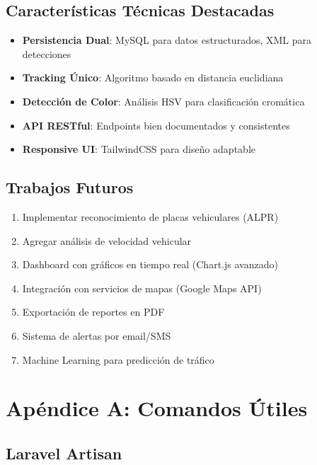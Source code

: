 \documentclass[12pt,a4paper]{article}
\begin{document}
\subsection{Características Técnicas Destacadas}

\begin{itemize}
    \item \textbf{Persistencia Dual}: MySQL para datos estructurados, XML para detecciones
    \item \textbf{Tracking Único}: Algoritmo basado en distancia euclidiana
    \item \textbf{Detección de Color}: Análisis HSV para clasificación cromática
    \item \textbf{API RESTful}: Endpoints bien documentados y consistentes
    \item \textbf{Responsive UI}: TailwindCSS para diseño adaptable
\end{itemize}

\subsection{Trabajos Futuros}

\begin{enumerate}
    \item Implementar reconocimiento de placas vehiculares (ALPR)
    \item Agregar análisis de velocidad vehicular
    \item Dashboard con gráficos en tiempo real (Chart.js avanzado)
    \item Integración con servicios de mapas (Google Maps API)
    \item Exportación de reportes en PDF
    \item Sistema de alertas por email/SMS
    \item Machine Learning para predicción de tráfico
\end{enumerate}

\newpage

\appendix

\section{Apéndice A: Comandos Útiles}

\subsection{Laravel Artisan}
\end{document}
